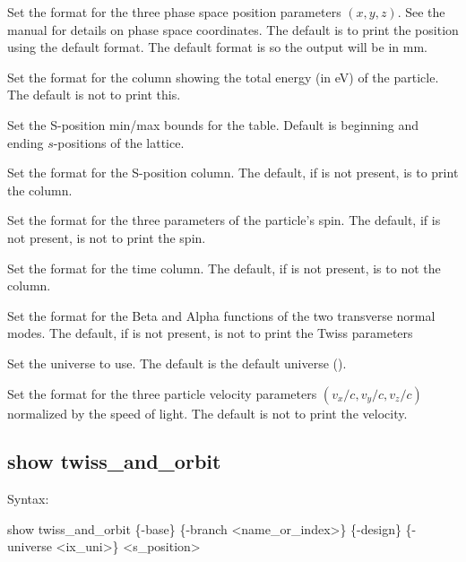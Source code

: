 {{{{{{{{{{\begin{description}
Set the format for the three phase space position parameters $(x, y, z)$. See the \bmad manual for 
details on phase space coordinates. The default is to print the position using the default format.
The default format is  so the output will be in mm.
%
\item[\vn{\{-energy \{<fmt>\}\}}] \Newline
Set the format for the column showing the total energy (in eV) of the particle. The default is not
to print this.
%
\item[\vn{\{-range <s1> <s2>\}}] \Newline
Set the S-position min/max bounds for the table. Default is beginning and ending $s$-positions of the
lattice.
%
\item[\vn{\{-s \{<fmt>\}\}}] \Newline
Set the format for the S-position column. The default, if  is not present, is to print the
column.
%
\item[\vn{\{-spin \{<fmt>\}\}}] \Newline
Set the format for the three parameters of the particle's spin. The default, if
 is not present, is not to print the spin.
%
\item[\vn{\{-time \{<fmt>\}\}}] \Newline
Set the format for the time column. The default, if  is not present, is to not the column.
%
\item[\vn{\{-twiss \{<fmt>\}\}}] \Newline
Set the format for the Beta and Alpha functions of the two transverse normal modes. The default, if
 is not present, is not to print the Twiss parameters
%
\item[\vn{\{-universe <ix_uni>\}}] \Newline
Set the universe to use. The default is the default universe ().
%
\item[\vn{\{-velocity \{<fmt>\}\}}] \Newline
Set the format for the three particle velocity parameters $(v_x/c, v_y/c, v_z/c)$ normalized by the
speed of light. The default is not to print the velocity.
%
\end{description}


\subsection{show twiss_and_orbit}
\label{s:show.twiss}

Syntax:
\begin{example}
    show twiss_and_orbit \{-base\} \{-branch <name_or_index>\} \{-design\}
    \{-universe <ix_uni>\} <s_position>
\end{example}

}}}}}}}}}}
